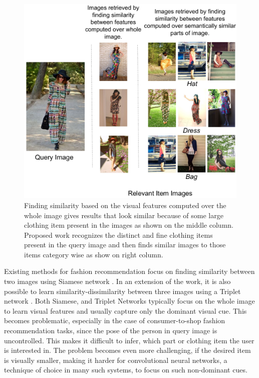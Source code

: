 \documentclass{article}
\begin{document}
\begin{figure}[t]
\includegraphics[width=1.0\linewidth]{teaser_staqu_texture}
\caption{Finding similarity based on the visual features computed over the whole image gives results that look similar because of some large clothing item present in the images as shown on the middle column. Proposed work recognizes the distinct and fine clothing items present in the query image and then finds similar images to those items category wise as show on right column.}
\label{fig:similar_items}
\end{figure}

Existing methods for fashion recommendation focus on finding similarity between two images using Siamese network \cite{HuangICCV2015, VeitICCV2015, WangICMR2016}. In an extension of the work, it is also possible to learn similarity-dissimilarity between three images using a Triplet network \cite{WangCVPR2014, SimoSerraCVPR2016}. Both Siamese, and Triplet Networks typically focus on the whole image to learn visual features and usually capture only the dominant visual cue. This becomes problematic, especially in the case of consumer-to-shop fashion recommendation tasks, since the pose of the person in query image is uncontrolled. This makes it difficult to infer, which part or clothing item the user is interested in. The problem becomes even more challenging, if the desired item is visually smaller, making it harder for convolutional neural networks, a technique of choice in many such systems, to focus on such non-dominant cues.
\end{document}
